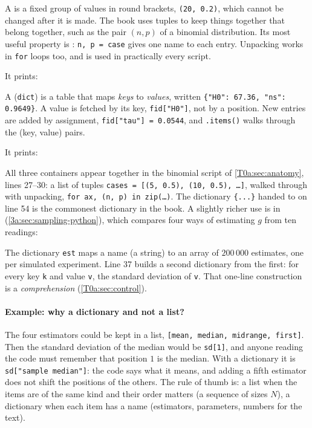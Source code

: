 A  is a fixed group of values in round brackets, \texttt{(20, 0.2)}, which cannot be changed after it is made. The book uses tuples to keep things together that belong together, such as the pair $(n,p)$ of a binomial distribution. Its most useful property is : \texttt{n, p = case} gives one name to each entry. Unpacking works in \texttt{for} loops too, and is used in practically every script.

\noindent It prints:

A  (\texttt{dict}) is a table that maps \emph{keys} to \emph{values}, written \texttt{\{"H0": 67.36, "ns": 0.9649\}}. A value is fetched by its key, \texttt{fid["H0"]}, not by a position. New entries are added by assignment, \texttt{fid["tau"] = 0.0544}, and \texttt{.items()} walks through the (key, value) pairs.

\noindent It prints:

All three containers appear together in the binomial script of \cref{T0a:sec:anatomy}, lines 27--30: a list of tuples \texttt{cases = [(5, 0.5), (10, 0.5), \dots]}, walked through with unpacking, \texttt{for ax, (n, p) in zip(\dots)}. The dictionary \texttt{\{...\}} handed to  on line 54 is the commonest dictionary in the book. A slightly richer use is in  (\cref{3a:sec:sampling-python}), which compares four ways of estimating $g$ from ten readings:


The dictionary \texttt{est} maps a name (a string) to an array of $200\,000$ estimates, one per simulated experiment. Line 37 builds a second dictionary from the first: for every key \texttt{k} and value \texttt{v}, the standard deviation of \texttt{v}. That one-line construction is a \emph{comprehension} (\cref{T0a:sec:control}).

\paragraph{Example: why a dictionary and not a list?} The four estimators could be kept in a list, \texttt{[mean, median, midrange, first]}. Then the standard deviation of the median would be \texttt{sd[1]}, and anyone reading the code must remember that position $1$ is the median. With a dictionary it is \texttt{sd["sample median"]}: the code says what it means, and adding a fifth estimator does not shift the positions of the others. The rule of thumb is: a list when the items are of the same kind and their order matters (a sequence of sizes $N$), a dictionary when each item has a name (estimators, parameters, numbers for the text).

